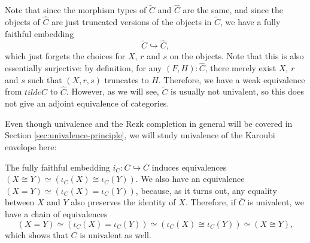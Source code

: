 \begin{remark}
  Note that since the morphism types of $ \tilde C $ and $ \hat C $ are the same, and since the objects of $ \hat C $ are just truncated versions of the objects in $ \tilde C $, we have a fully faithful embedding
  \[ \tilde C \hookrightarrow \hat C, \]
  which just forgets the choices for $ X $, $ r $ and $ s $ on the objects. Note that this is also essentially surjective: by definition, for any $ (F, H) : \hat C $, there merely exist $ X $, $ r $ and $ s $ such that $ (X, r, s) $ truncates to $ H $.
  Therefore, we have a weak equivalence from $ tilde C $ to $ \hat C $. However, as we will see, $ \tilde C $ is usually not univalent, so this does not give an adjoint equivalence of categories.
\end{remark}

Even though univalence and the Rezk completion in general will be covered in Section \ref{sec:univalence-principle}, we will study univalence of the Karoubi envelope here:

\begin{remark}
  The fully faithful embedding $ i_C : C \hookrightarrow \overline C $ induces equivalences $ (X \cong Y) \simeq (\iota_C(X) \cong \iota_C(Y)) $. We also have an equivalence $ (X = Y) \simeq (\iota_C(X) = \iota_C(Y)) $, because, as it turns out, any equality between $ X $ and $ Y $ also preserves the identity of $ X $. Therefore, if $ \overline C $ is univalent, we have a chain of equivalences
  \[ (X = Y) \simeq (\iota_C(X) = \iota_C(Y)) \simeq (\iota_C(X) \cong \iota_C(Y)) \simeq (X \cong Y), \]
  which shows that $ C $ is univalent as well.
\end{remark}

